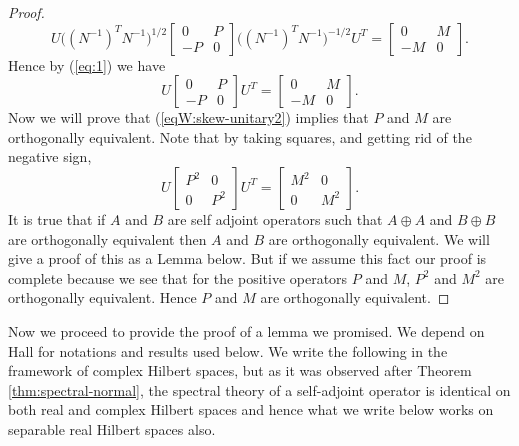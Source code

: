 \documentclass[12pt,a4paper,twoside]{article}
\numberwithin{equation}{section}
\theoremstyle{definition}  %
\theoremstyle{plain}  %
\theoremstyle{remark} %
\begin{document}
\begin{proof}
\begin{equation*}
  U\big( (N^{-1})^{T}N^{-1}\big)^{1/2}\begin{bmatrix}
              0 &  P   \\
               - P & 0
             \end{bmatrix}\big( (N^{-1})^{T}N^{-1}\big)^{-1/2} U^{T}
    = \begin{bmatrix}
              0 & M  \\
              -M & 0
             \end{bmatrix}.
\end{equation*}
Hence by (\ref{eq:1}) we have
\begin{equation}\label{eqW:skew-unitary2}
    U\begin{bmatrix}
              0 &  P   \\
               - P & 0
             \end{bmatrix}U^{T}
    = \begin{bmatrix}
              0 & M  \\
              -M & 0
             \end{bmatrix}.
\end{equation}
Now we will prove that (\ref{eqW:skew-unitary2}) implies  that $P$ and $M$ are orthogonally equivalent. Note that by taking squares, and getting rid of the negative sign,
\begin{equation*}
              U \begin{bmatrix}
              P^2 &  0   \\
                 0 & P^2
             \end{bmatrix}U^{T} =\begin{bmatrix}
              M^2 &  0   \\
                 0 &  M^2
             \end{bmatrix}.
\end{equation*} It is true that if $A$ and $B$ are self adjoint operators such that $A\oplus A$ and $B \oplus B$ are orthogonally equivalent then $A$ and $B$ are orthogonally equivalent. We will give a proof of this as a Lemma below. But if we assume this fact our proof is complete because we see that for the positive operators $P$ and $M$, $P^2$ and $M^2$ are orthogonally equivalent. Hence $P$ and $M$ are orthogonally equivalent.
\end{proof}

Now we proceed to provide the proof of a lemma we promised. We depend on Hall \cite{Hall13} for notations and results used below. We write the following in the framework of complex Hilbert spaces, but as it was observed after Theorem \ref{thm:spectral-normal}, the spectral theory of a self-adjoint operator is identical on both real and complex Hilbert spaces and hence what we write below works on separable real Hilbert spaces also.
\end{document}
